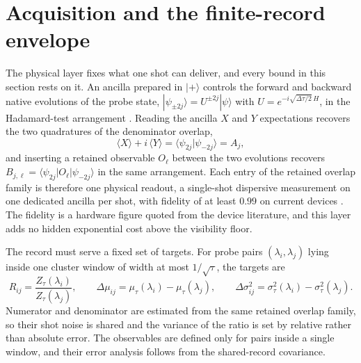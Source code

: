 \section{Acquisition and the finite-record envelope}\label{sec:N4}

The physical layer fixes what one shot can deliver, and every bound in this section rests on it. An ancilla prepared in $|+\rangle$ controls the forward and backward native evolutions of the probe state, $|\psi_{\pm 2j}\rangle = U^{\pm 2j}|\psi\rangle$ with $U = e^{-i\sqrt{\Delta\tau/2}\,H}$, in the Hadamard-test arrangement \cite{knill1998power}. Reading the ancilla $X$ and $Y$ expectations recovers the two quadratures of the denominator overlap,
\begin{equation}\label{def:iqm-ancilla-readout}
\langle X\rangle + i\,\langle Y\rangle = \langle\psi_{2j}|\psi_{-2j}\rangle = A_j ,
\end{equation}
and inserting a retained observable $O_\ell$ between the two evolutions recovers $B_{j,\ell} = \langle\psi_{2j}|O_\ell|\psi_{-2j}\rangle$ in the same arrangement. Each entry of the retained overlap family is therefore one physical readout, a single-shot dispersive measurement on one dedicated ancilla per shot, with fidelity of at least $0.99$ on current devices \cite{krantz2019engineer, marxer2023long}. The fidelity is a hardware figure quoted from the device literature, and this layer adds no hidden exponential cost above the visibility floor.

The record must serve a fixed set of targets. For probe pairs $(\lambda_i, \lambda_j)$ lying inside one cluster window of width at most $1/\sqrt{\tau}$, the targets are
\begin{equation}\label{def:within-window-ratio-observables}
R_{ij} = \frac{Z_\tau(\lambda_i)}{Z_\tau(\lambda_j)}, \qquad
\Delta\mu_{ij} = \mu_\tau(\lambda_i) - \mu_\tau(\lambda_j), \qquad
\Delta\sigma^2_{ij} = \sigma^2_\tau(\lambda_i) - \sigma^2_\tau(\lambda_j).
\end{equation}
Numerator and denominator are estimated from the same retained overlap family, so their shot noise is shared and the variance of the ratio is set by relative rather than absolute error. The observables are defined only for pairs inside a single window, and their error analysis follows from the shared-record covariance.


